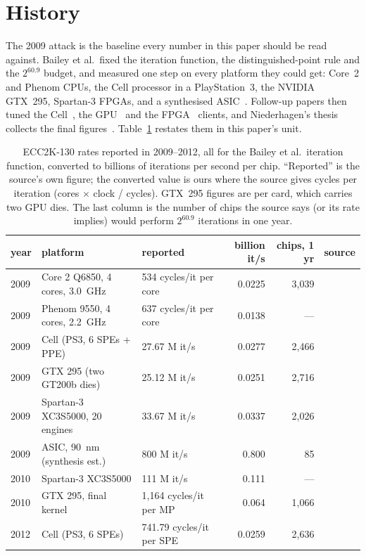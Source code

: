 \section{History}
\label{sec:history}

The 2009 attack is the baseline every number in this paper should be
read against. Bailey et al.\ fixed the iteration function, the
distinguished-point rule and the $2^{60.9}$ budget, and measured one
step on every platform they could get: Core~2 and Phenom CPUs, the
Cell processor in a PlayStation~3, the NVIDIA GTX~295, Spartan-3
FPGAs, and a synthesised ASIC~\cite{bailey2009}. Follow-up papers
then tuned the Cell~\cite{bos2010cell}, the GPU~\cite{bernstein2010gpu}
and the FPGA~\cite{fan2010fpga} clients, and Niederhagen's thesis
collects the final figures~\cite{niederhagen2012thesis}.
Table~\ref{tab:history} restates them in this paper's unit.

\begin{table}[t]
\centering
\footnotesize
\setlength{\tabcolsep}{3pt}
\caption{ECC2K-130 rates reported in 2009--2012, all for the
  Bailey et al.\ iteration function, converted to billions of
  iterations per second per chip. ``Reported'' is the source's own
  figure; the converted value is ours where the source gives cycles
  per iteration (cores $\times$ clock / cycles). GTX~295 figures are
  per card, which carries two GPU dies. The last column is the number
  of chips the source says (or its rate implies) would perform
  $2^{60.9}$ iterations in one year.}
\label{tab:history}
\begin{tabular}{@{}lllrrr@{}}
\toprule
year & platform & reported & billion it/s & chips, 1 yr & source \\
\midrule
2009 & Core 2 Q6850, 4 cores, 3.0~GHz & 534 cycles/it per core & 0.0225 & 3{,}039 & \cite{bailey2009} \\
2009 & Phenom 9550, 4 cores, 2.2~GHz & 637 cycles/it per core & 0.0138 & --- & \cite{bailey2009} \\
2009 & Cell (PS3, 6 SPEs + PPE) & 27.67 M it/s & 0.0277 & 2{,}466 & \cite{bailey2009} \\
2009 & GTX 295 (two GT200b dies) & 25.12 M it/s & 0.0251 & 2{,}716 & \cite{bailey2009} \\
2009 & Spartan-3 XC3S5000, 20 engines & 33.67 M it/s & 0.0337 & 2{,}026 & \cite{bailey2009} \\
2009 & ASIC, 90~nm (synthesis est.) & 800 M it/s & 0.800 & 85 & \cite{bailey2009} \\
2010 & Spartan-3 XC3S5000 & 111 M it/s & 0.111 & --- & \cite{fan2010fpga} \\
2010 & GTX 295, final kernel & 1{,}164 cycles/it per MP & 0.064 & 1{,}066 & \cite{bernstein2010gpu,niederhagen2012thesis} \\
2012 & Cell (PS3, 6 SPEs) & 741.79 cycles/it per SPE & 0.0259 & 2{,}636 & \cite{niederhagen2012thesis} \\
\bottomrule
\end{tabular}
\end{table}

